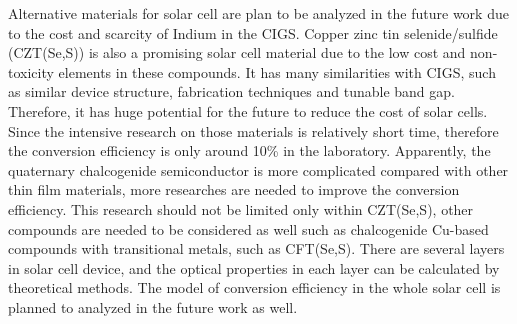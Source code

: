 \documentclass[a4paper, 12pt, titlepage,oneside,drop]{kthesis}
\begin{document}
Alternative materials for solar cell are plan to be analyzed in the future work due to the cost and scarcity of Indium in the CIGS. Copper zinc tin selenide/sulfide (CZT(Se,S)) is also a promising solar cell material due to the 
low cost and non-toxicity elements in these compounds. It has many similarities with CIGS, such as similar device structure, fabrication techniques and tunable band gap. Therefore, it has huge potential for the future to reduce
the cost of solar cells. Since the intensive research on those materials is relatively short time, therefore the conversion efficiency is only around 10\% in the laboratory. Apparently, the quaternary chalcogenide semiconductor is more 
complicated compared with other thin film materials, more researches are needed to improve the conversion efficiency.  This research should not be limited only within CZT(Se,S), other compounds are needed to be considered as well such as
chalcogenide Cu-based compounds with transitional metals, such as CFT(Se,S). There are several layers in solar cell device, and the optical properties in each layer can be calculated by theoretical methods. 
The model of conversion efficiency in the whole solar cell is planned to analyzed in the future work as well. 



 
\end{document}
